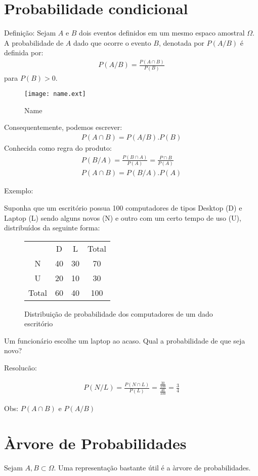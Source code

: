 \documentclass[11pt,a4paper]{book}
\begin{document}
\begin{enumerate}[label=(\alph*)]
\begin{enumerate}
\section{Probabilidade condicional}
Definição: Sejam $A$ e $B$ dois eventos definidos em um mesmo espaco amostral $\Omega$.
A probabilidade de $A$  dado que ocorre o evento $B$, denotada por $P(A/B)$ é definida por:
\begin{align}
  P(A/B)= \frac{P(A\cap B)}{P(B)}
\end{align}
para $P(B)>0$. 
\begin{figure}[htpb]
  \centering
  \texttt{[image: name.ext]}
  \caption{Name}
  \label{fig:15}
\end{figure}
Consequentemente, podemos escrever:
\begin{align}
  P(A\cap B)= P(A/B).P(B)
\end{align}
Conhecida como regra do produto:
\begin{align}
  P(B/A)= \frac{P(B \cap A)}{P(A)}= \frac{P\cap B}{P(A)}\\
  P(A \cap B)= P(B/A).P(A)
\end{align}

Exemplo: 

Suponha que um escritório possua 100 computadores de tipos Desktop (D) e 
Laptop (L) sendo alguns novos (N) e outro com um certo tempo de uso (U), distribuídos da seguinte forma:
\begin{figure} 
  \centering
  \begin{tabular}{c c c c}
    \toprule
    &D&L&Total\\ \cmidrule{2-4}
    N&40&30&70\\ \cmidrule{2-4}
    U&20&10&30\\ \cmidrule{2-4}
    Total&60&40&100 \\\bottomrule
  \end{tabular}
  \label{fig:16}
  \caption{Distribuição de probabilidade dos computadores de um dado escritório}
\end{figure}
Um funcionário escolhe um laptop ao acaso. Qual a probabilidade de que seja novo?

Resolucão: 

\begin{align*}
  P(N/L)= \frac{P(N \cap L)}{P(L)}= \frac{\frac{30}{100}}{\frac{40}{100}}=\frac{3}{4}
\end{align*}

Obs: $P(A \cap B)$ e $P(A/B)$

\section{Àrvore de Probabilidades}
Sejam $A,B \subset \Omega$. Uma representação bastante útil é a àrvore de probabilidades.


\end{enumerate}
\end{enumerate}
\end{document}
